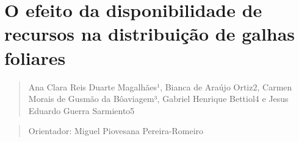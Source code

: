 \documentclass[
]{book}
\begin{document}
\chapter{O efeito da disponibilidade de recursos na distribuição de galhas foliares}\label{o-efeito-da-disponibilidade-de-recursos-na-distribuiuxe7uxe3o-de-galhas-foliares}

\begin{quote}
Ana Clara Reis Duarte Magalhães¹, Bianca de Araújo Ortiz2, Carmen Morais de Gusmão da Bôaviagem³, Gabriel Henrique Bettiol4 e Jesus Eduardo Guerra Sarmiento5
\end{quote}

\begin{quote}
Orientador: Miguel Piovesana Pereira-Romeiro
\end{quote}
\end{document}
